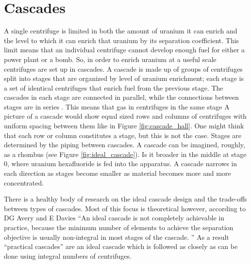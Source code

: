 \section{Cascades}
\label{s_cascade}
A single centrifuge is limited in both the amount of uranium it can enrich and the level to which it can enrich that uranium by its separation coefficient. This limit means that an individual centrifuge cannot develop enough fuel for either a power plant or a bomb. So, in order to enrich uranium at a useful scale centrifuges are set up in cascades. A cascade is made up of groups of centrifuges split into stages that are organized by level of uranium enrichment; each stage is a set of identical centrifuges that enrich fuel from the previous stage. The cascades in each stage are connected in parallel, while the connections between stages are in series . This means that gas in centrifuges in the same stage 
A picture of a cascade would show equal sized rows and columns of centrifuges with uniform spacing between them like in Figure \ref{fig:cascade_hall}. One might think that each row or column constitutes a stage, but this is not the case. Stages are determined by the piping between cascades. A cascade can be imagined, roughly, as a rhombus (see Figure \ref{fig:ideal_cascade}). Is it broader in the middle at stage 0, where uranium hexafluoride is fed into the apparatus. A cascade narrows in each direction as stages become smaller as material becomes more and more concentrated.  

\iffalse
\begin{figure}%
\texttt{[image: ./figs/ideal\_cascade.png]}
\caption{Diagram of an Ideal Cascade by Avery and Davies \TODO{Cite in caption?}}
\label{fig:ideal_cascade}
\end{figure}
\fi

\iffalse
\begin{figure}%
\texttt{[image: ./figs/cascade\_hall.png]}
\caption{A US Department of Energy Photo of a Gas Centrifuge Cascade \TODO{Figure Copyrights?}}
\label{fig:cascade_hall}
\end{figure}
\fi

There is a healthy body of research on the ideal cascade design and the trade-offs between types of cascades. Most of this focus is theoretical however, according to DG Avery and E Davies “An ideal cascade is not completely achievable in practice, because the minimum number of elements to achieve the separation objective is usually non-integral in most stages of the cascade. ”\cite{avery_1973} %
As a result “practical cascades” are an ideal cascade which is followed as closely as can be done using integral numbers of centrifuges.

